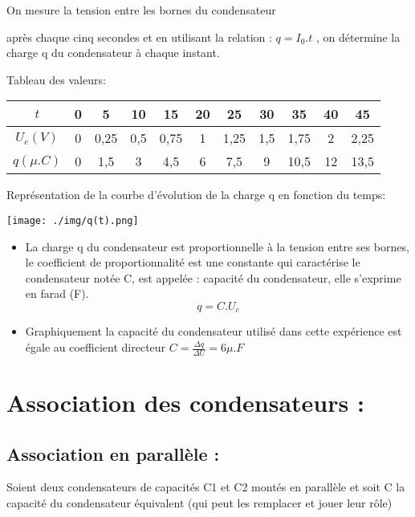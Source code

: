 \documentclass[12pt]{article}
\begin{document}
On mesure la tension entre les bornes du condensateur

après chaque cinq secondes et en utilisant la relation : $q=I_0.t$ , on détermine la charge q du condensateur à chaque instant.

Tableau des valeurs: 
\begin{center}
   \begin{tabular}{ |c|c|c|c|c|c|c|c|c|c|c| }
	  \hline
	  $t$       &0   & 5    & 10 & 15   & 20  &25  & 30  & 35 & 40 & 45 \\
	  \hline
	  $U_c(V)$  & 0  &0,25  & 0,5& 0,75&1     &1,25 &1,5 &1,75&2	&2,25  \\\hline
	  $q(\mu.C)$& 0  &  1,5 & 3  &   4,5& 6   &7,5& 9   &10,5&12  &13,5\\
\hline
\end{tabular}
\end{center}
Représentation de la courbe d'évolution de la charge q en fonction du temps:

\begin{center}
	\texttt{[image: ./img/q(t).png]}
\end{center}

\begin{itemize}
	\item La charge q du condensateur est proportionnelle à la tension entre ses bornes, le coefficient de proportionnalité est une constante
qui caractérise le condensateur notée C, est appelée : capacité du condensateur, elle s’exprime en farad (F).
$$q = C.U_c$$

\item Graphiquement la capacité du condensateur utilisé dans cette expérience est égale au coefficient directeur $C = \frac{\Delta{q}}{\Delta{U}} = 6\mu.F$

\end{itemize}


\section{Association des condensateurs : }

\subsection{Association en parallèle : }
Soient deux condensateurs de capacités C1 et C2 montés en parallèle et soit C la capacité du condensateur équivalent (qui peut les
remplacer et jouer leur rôle)
\end{document}
